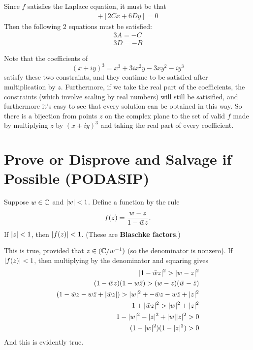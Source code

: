 \documentclass{homework}
\begin{document}
\begin{solution}
Since $f$ satisfies the Laplace equation, it must be that
\begin{align*}
  [6Ax+2By] + [2Cx + 6Dy] = 0
\end{align*}
Then the following 2 equations must be satisfied:
\begin{align*}
3A = -C\\
3D = -B
\end{align*}

Note that the coefficients of
\[
(x+iy)^3 = x^3 + 3ix^2y - 3xy^2 - iy^3
\]
satisfy these two constraints, and they continue to be satisfied after multiplication by $z$. Furthermore, if we take the real part of the coefficients, the constraints (which involve scaling by real numbers) will still be satisified, and furthermore it's easy to see that every solution can be obtained in this way.
So there is a bijection from points $z$ on the complex plane to the set of valid $f$ made by multiplying $z$ by $(x+iy)^3$ and taking the real part of every coefficient.

\end{solution}
\section{Prove or Disprove and Salvage if Possible (PODASIP)}

\begin{problem}\label{blaschke-factors}
  Suppose $w \in \mathbb{C}$ and $\left|w\right| < 1$.  Define a function by the rule
  \[
    f(z) = \frac{w - z}{1 - \bar{w}z}.
  \]
  If $\left|z\right| < 1$, then $\left|f(z)\right| < 1$.  (These are \textbf{Blaschke factors}.)
\end{problem}
\begin{solution}
This is true, provided that $z\in(\mathbb{C}/\bar{w}^{-1})$ (so the denominator is nonzero).
If $\left|f(z)\right| < 1$, then multiplying by the denominator and squaring gives
\begin{align*}
|1-\bar{w}z|^2 > |w-z|^2\\
(1-\bar{w}z)(1-w\bar{z}) > (w-z)(\bar{w}-\bar{z}) \\
(1-\bar{w}z-w\bar{z}+|\bar{w}z|) > |w|^2 + -\bar{w}z - w\bar{z}+ |z|^2\\
1 + |\bar{w}z|^2 > |w|^2 + |z|^2 \\
1 - |w|^2 - |z|^2 + |w||z|^2 > 0\\
(1 - |w|^2)(1 - |z|^2) > 0
\end{align*}
And this is evidently true.
\end{solution}
\end{document}
